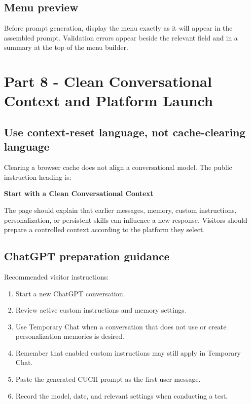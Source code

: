 \documentclass[11pt,letterpaper]{article}
\begin{document}
\subsection{Menu preview}

Before prompt generation, display the menu exactly as it will appear in the
assembled prompt. Validation errors appear beside the relevant field and in a
summary at the top of the menu builder.

\section{Part 8 - Clean Conversational Context and Platform Launch}

\subsection{Use context-reset language, not cache-clearing language}

Clearing a browser cache does not align a conversational model. The public
instruction heading is:

\begin{notebox}
\textbf{Start with a Clean Conversational Context}
\end{notebox}

The page should explain that earlier messages, memory, custom instructions,
personalization, or persistent skills can influence a new response. Visitors
should prepare a controlled context according to the platform they select.

\subsection{ChatGPT preparation guidance}

Recommended visitor instructions:

\begin{enumerate}
    \item Start a new ChatGPT conversation.
    \item Review active custom instructions and memory settings.
    \item Use Temporary Chat when a conversation that does not use or create
          personalization memories is desired.
    \item Remember that enabled custom instructions may still apply in Temporary Chat.
    \item Paste the generated CUCII prompt as the first user message.
    \item Record the model, date, and relevant settings when conducting a test.
\end{enumerate}
\end{document}
